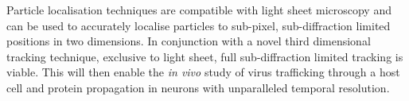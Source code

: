 %

Particle localisation techniques are compatible with light sheet microscopy and can be used to accurately localise particles to sub-pixel, sub-diffraction limited positions in two dimensions.
In conjunction with a novel third dimensional tracking technique, exclusive to light sheet, full sub-diffraction limited tracking is viable\cite{Spille2015a}.
This will then enable the \textit{in vivo} study of virus trafficking through a host cell and protein propagation in neurons with unparalleled temporal resolution.










